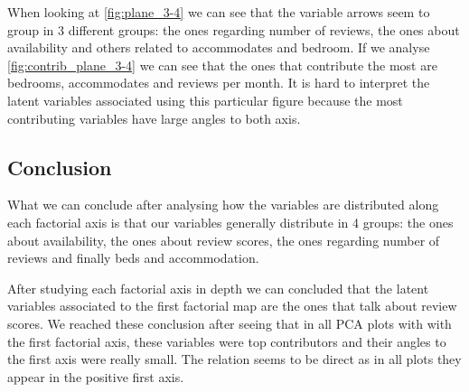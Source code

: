 When looking at \cref{fig:plane_3-4} we can see that the variable arrows seem to group in 3 different groups: the ones regarding number of reviews, the ones about availability and others related to accommodates and bedroom. If we analyse \cref{fig:contrib_plane_3-4} we can see that the ones that contribute the most are bedrooms, accommodates 
and reviews per month. It is hard to interpret the latent variables associated using this particular figure because the most contributing variables have large angles to both axis.


\begin{landscape}



\subsection{Conclusion}%
What we can conclude after analysing how the variables are distributed along each factorial axis is 
that our variables generally distribute in 4 groups: the ones about availability, 
the ones about review scores, the ones regarding number of reviews and finally beds and accommodation.

After studying each factorial axis in depth we can concluded that the latent variables associated to 
the first factorial map are the ones that talk about review scores. We reached these conclusion after
seeing that in all PCA plots with with the first factorial axis, these variables were top contributors
and their angles to the first axis were really small. The relation seems to be direct as in all plots 
they appear in the positive first axis.

\end{landscape}








